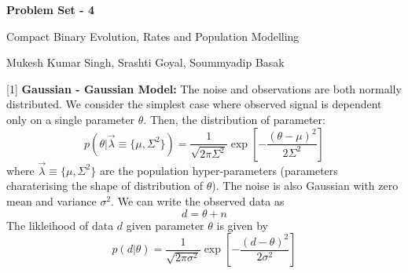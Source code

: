 \documentclass{article} %
\newcommand{\question}[2][]{\begin{flushleft}
        \textbf{Problem #1}: %
\end{flushleft}
}
\newcommand{\maketitletwo}[2][]{\begin{center}
        \Large{\textbf{Problem Set - 4}
            
            Compact Binary Evolution, Rates and Population Modelling} %
        \vspace{10pt}
        
        \normalsize{Mukesh Kumar Singh, Srashti Goyal, Soummyadip Basak  %
        } %
        \vspace{15pt}
        
\end{center}}
\begin{document}
    \maketitletwo[5]  %
    
    \question[1]{} \textbf{Gaussian - Gaussian Model:}  The noise and observations are both normally distributed. We consider the simplest case where observed signal is dependent only on a single parameter $\theta$. Then, the distribution of parameter:
    \begin{equation}
    p(\theta|\Vec{\lambda} \equiv \{\mu, \Sigma^2\}) = \frac{1}{\sqrt{2 \pi  \Sigma^2}} \exp \left[ -\frac{(\theta-\mu)^2}{2 \Sigma^2}\right]
    \end{equation}
    where $\Vec{\lambda} \equiv \{\mu, \Sigma^2\}$ are the population hyper-parameters (parameters charaterising the shape of distribution of $\theta$). The noise is also Gaussian with zero mean and variance $\sigma^2$. We can write the observed data as
    \begin{equation}
        d = \theta + n
    \end{equation}
    The likleihood of data $d$ given parameter $\theta$ is given by 
    \begin{equation}
        p(d|\theta) = \frac{1}{\sqrt{2 \pi  \sigma^2}} \exp \left[ -\frac{(d - \theta)^2}{2 \sigma^2}\right]
    \end{equation}
\end{document}
